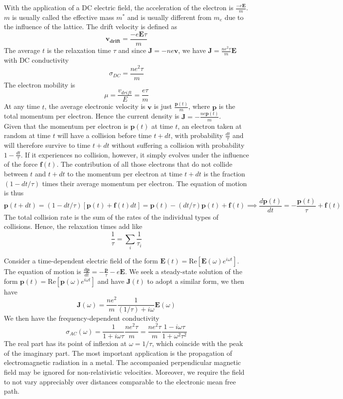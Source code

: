 \documentclass[a4paper]{article}
\begin{document}
\begin{Note}
With the application of a DC electric field, the acceleration of the electron is $\frac{-e\mathbf{E}}{m}$. $m$ is usually called the effective mass $m^*$ and is usually different from $m_e$ due to the influence of the lattice. The drift velocity is defined as
$$\mathbf{v_{drift}}=\frac{-e\mathbf{E}\tau}{m}$$
The average $t$ is the relaxation time $\tau$ and since $\mathbf{J}=-ne\mathbf{v}$, we have $\mathbf{J}=\frac{ne^2\tau}{m}\mathbf{E}$ with DC conductivity
$$\sigma_{DC}=\frac{ne^2\tau}{m}$$
The electron mobility is
$$\mu=\frac{v_{drift}}{E}=\frac{e\tau}{m}$$
At any time $t$, the average electronic velocity is $\mathbf{v}$ is just $\frac{\mathbf{p}(t)}{m}$, where $\mathbf{p}$ is the total momentum per electron. Hence the current density is $\mathbf{J}=-\frac{ne\mathbf{p}(t)}{m}$.\\[5pt]
Given that the momentum per electron is $\mathbf{p}(t)$ at time $t$, an electron taken at random at time $t$ will have a collision before time $t+dt$, with probability $\frac{dt}{\tau}$ and will therefore survive to time $t+dt$ without suffering a collision with probability $1-\frac{dt}{\tau}$. If it experiences no collision, however, it simply evolves under the influence of the force $\textbf{f}(t)$. The contribution of all those electrons that do not collide between $t$ and $t+dt$ to the momentum per electron at time $t+dt$ is the fraction $(1-dt/\tau)$ times their average momentum per electron. The equation of motion is thus
$$\mathbf{p}(t+dt)=(1-dt/\tau)[\mathbf{p}(t)+\mathbf{f}(t)dt]=\mathbf{p}(t)-(dt/\tau)\mathbf{p}(t)+\mathbf{f}(t)\implies\frac{d\mathbf{p}(t)}{dt}=-\frac{\mathbf{p}(t)}{\tau}+\mathbf{f}(t)$$
The total collision rate is the sum of the rates of the individual types of collisions. Hence, the relaxation times add like
$$\frac{1}{\tau}=\sum_i\frac{1}{\tau_i}$$
\end{Note}
\begin{Note}
Consider a time-dependent electric field of the form $\mathbf{E}(t)=\text{Re}[\mathbf{E}(\omega)e^{i\omega t}]$. The equation of motion is $\frac{d\mathbf{p}}{dt}=-\frac{\mathbf{p}}{\tau}-e\mathbf{E}$. We seek a steady-state solution of the form $\mathbf{p}(t)=\text{Re}[\mathbf{p}(\omega)e^{i\omega t}]$ and have $\mathbf{J}(t)$ to adopt a similar form, we then have
$$\mathbf{J}(\omega)=\frac{ne^2}{m}\frac{1}{(1/\tau)+i\omega}\mathbf{E}(\omega)$$
We then have the frequency-dependent conductivity
$$\sigma_{AC}(\omega)=\frac{1}{1+i\omega\tau}\frac{ne^2\tau}{m}=\frac{ne^2\tau}{m}\frac{1-i\omega\tau}{1+\omega^2\tau^2}$$
The real part has its point of inflexion at $\omega=1/\tau$, which coincide with the peak of the imaginary part. The most important application is the propagation of electromagnetic radiation in a metal. The accompanied perpendicular magnetic field may be ignored for non-relativistic velocities. Moreover, we require the field to not vary appreciably over distances comparable to the electronic mean free path.
\end{Note}
\end{document}
